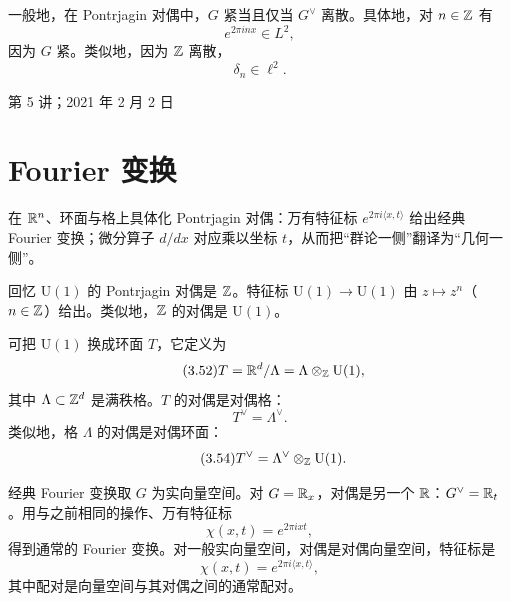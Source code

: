 一般地，在 Pontrjagin 对偶中，$G$ 紧当且仅当 $G^{\vee}$ 离散。具体地，对 $n\in\mathbb{Z}$ 有
\begin{equation}\tag{3.50}
e^{2\pi inx}\in L^2,
\end{equation}
因为 $G$ 紧。类似地，因为 $\mathbb{Z}$ 离散，
\begin{equation}\tag{3.51}
\delta_n\in\ell^2.
\end{equation}

\begin{flushright}\small 第 5 讲；2021 年 2 月 2 日\end{flushright}

\section{Fourier 变换}

\begin{sectionkey}
在 $\mathbb{R}^n$、环面与格上具体化 Pontrjagin 对偶：万有特征标 $e^{2\pi i\langle x,t\rangle}$ 给出经典 Fourier 变换；微分算子 $d/dx$ 对应乘以坐标 $t$，从而把“群论一侧”翻译为“几何一侧”。
\end{sectionkey}

回忆 $\mathrm{U}(1)$ 的 Pontrjagin 对偶是 $\mathbb{Z}$。特征标 $\mathrm{U}(1)\to\mathrm{U}(1)$ 由 $z\mapsto z^{n}$（$n\in\mathbb{Z}$）给出。类似地，$\mathbb{Z}$ 的对偶是 $\mathrm{U}(1)$。

可把 $\mathrm{U}(1)$ 换成环面 $T$，它定义为
\begin{equation}\tag{3.52}
T=\mathbb{R}^{d}/\Lambda=\Lambda\otimes_{\mathbb{Z}}\mathrm{U}(1),
\end{equation}
其中 $\Lambda\subset\mathbb{Z}^{d}$ 是满秩格。$T$ 的对偶是对偶格：
\begin{equation}\tag{3.53}
T^{\vee}=\Lambda^{\vee}.
\end{equation}
类似地，格 $\Lambda$ 的对偶是对偶环面：
\begin{equation}\tag{3.54}
T^{\vee}=\Lambda^{\vee}\otimes_{\mathbb{Z}}\mathrm{U}(1).
\end{equation}

经典 Fourier 变换取 $G$ 为实向量空间。对 $G=\mathbb{R}_x$，对偶是另一个 $\mathbb{R}$：$G^{\vee}=\mathbb{R}_t$。用与之前相同的操作、万有特征标
\begin{equation}\tag{3.55}
\chi(x,t)=e^{2\pi ixt},
\end{equation}
得到通常的 Fourier 变换。对一般实向量空间，对偶是对偶向量空间，特征标是
\begin{equation}\tag{3.56}
\chi(x,t)=e^{2\pi i\langle x,t\rangle},
\end{equation}
其中配对是向量空间与其对偶之间的通常配对。

